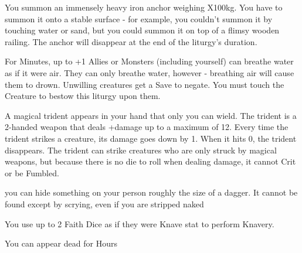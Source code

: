 {You summon an immensely heavy iron anchor weighing \DICE X100kg.  You have to summon it onto a stable surface - for example, you couldn't summon it by touching water or sand, but you could summon it on top of a flimsy wooden railing.  The anchor will disappear at the end of the liturgy's duration.
\LITURGY [
  Name= Mermaid's Breath,
  Link=ikitikbubuoe-liturgy-liturgy-mermaids-breath,
  Paradigm= Biomancy ,
  Save=  Y (negates) ,
  Duration= \SUMDICE Minutes ,
  Counter=  n/a  ,
  Keywords= Splittable ,
  Target=   Self / Close (touch)
]



For \SUMDICE Minutes, up to \DICE+1 Allies or Monsters (including yourself) can breathe water as if it were air.  They can only breathe water, however - breathing air will cause them to drown. Unwilling creatures get a Save to negate.  You must touch the Creature to bestow this liturgy upon them. 
\LITURGY [
  Name= Trident of Ik'tik'buboe,
  Link=ikitikbubuoe-liturgy-trident,
  Paradigm= Force ,
  Save=  N ,
  Duration= Session ,
  Counter=  n/a  ,
  Keywords= None ,
  Target=   Self
]



A magical trident appears in your hand that only you can wield.  The trident is a 2-handed weapon that deals \DICE+\DICE damage up to a maximum of 12. Every time the trident strikes a creature, its damage goes down by 1.  When it hits 0, the trident disappears.  The trident can strike creatures who are only struck by magical weapons, but because there is no die to roll when dealing damage, it cannot Crit or be Fumbled.



\GOD[
Name=Loki,
Link=small-god-loki,
GodOf=King of Thieves,
Holy=an image of two snakes circling one another to form an 'S' shape and biting the tail of the other
]


you can hide something on your person roughly the size of a dagger. It cannot be found except by scrying, even if you are stripped naked


You use up to 2 Faith Dice as if they were Knave {stat} to perform Knavery.




\GOD[
Name=Nyx,
Link=small-god-nyx,
GodOf=Cousin of Death,
Holy=a black lace shroud
]


You can appear dead for Hours

}
